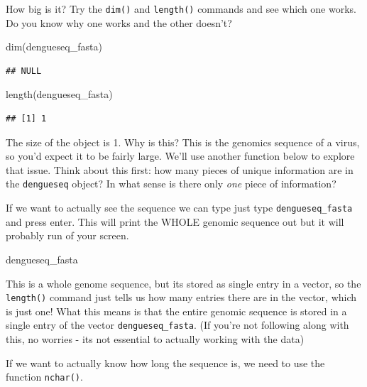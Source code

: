 \documentclass[
]{book}
\newenvironment{Shaded}{\begin{snugshade}}{\end{snugshade}}
\newcommand{\FunctionTok}[1]{\textcolor[rgb]{0.00,0.00,0.00}{#1}}
\newcommand{\NormalTok}[1]{#1}
\begin{document}
How big is it? Try the \texttt{dim()} and \texttt{length()} commands and see which one works. Do you know why one works and the other doesn't?

\begin{Shaded}
\begin{Highlighting}[]
\FunctionTok{dim}\NormalTok{(dengueseq\_fasta)}
\end{Highlighting}
\end{Shaded}

\begin{verbatim}
## NULL
\end{verbatim}

\begin{Shaded}
\begin{Highlighting}[]
\FunctionTok{length}\NormalTok{(dengueseq\_fasta)}
\end{Highlighting}
\end{Shaded}

\begin{verbatim}
## [1] 1
\end{verbatim}

The size of the object is 1. Why is this? This is the genomics sequence of a virus, so you'd expect it to be fairly large. We'll use another function below to explore that issue. Think about this first: how many pieces of unique information are in the \texttt{dengueseq} object? In what sense is there only \emph{one} piece of information?

If we want to actually see the sequence we can type just type \texttt{dengueseq\_fasta} and press enter. This will print the WHOLE genomic sequence out but it will probably run of your screen.

\begin{Shaded}
\begin{Highlighting}[]
\NormalTok{dengueseq\_fasta}
\end{Highlighting}
\end{Shaded}

This is a whole genome sequence, but its stored as single entry in a vector, so the \texttt{length()} command just tells us how many entries there are in the vector, which is just one! What this means is that the entire genomic sequence is stored in a single entry of the vector \texttt{dengueseq\_fasta}. (If you're not following along with this, no worries - its not essential to actually working with the data)

If we want to actually know how long the sequence is, we need to use the function \texttt{nchar()}.
\end{document}
